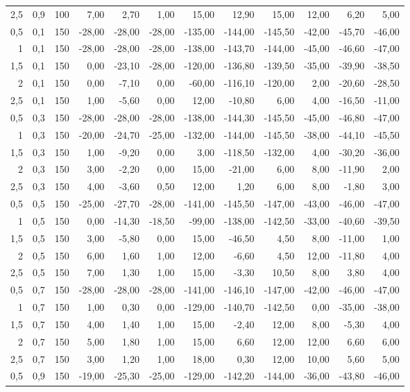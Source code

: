 \begin{table}[h]
\begin{tabular}{|r|r|r|r|r|r|r|r|r|r|r|r|}
2,5 & 0,9 & 100 & 7,00 & 2,70 & 1,00 & 15,00 & 12,90 & 15,00 & 12,00 & 6,20 & 5,00 \\
0,5 & 0,1 & 150 & -28,00 & -28,00 & -28,00 & -135,00 & -144,00 & -145,50 & -42,00 & -45,70 & -46,00 \\
1 & 0,1 & 150 & -28,00 & -28,00 & -28,00 & -138,00 & -143,70 & -144,00 & -45,00 & -46,60 & -47,00 \\
1,5 & 0,1 & 150 & 0,00 & -23,10 & -28,00 & -120,00 & -136,80 & -139,50 & -35,00 & -39,90 & -38,50 \\
2 & 0,1 & 150 & 0,00 & -7,10 & 0,00 & -60,00 & -116,10 & -120,00 & 2,00 & -20,60 & -28,50 \\
2,5 & 0,1 & 150 & 1,00 & -5,60 & 0,00 & 12,00 & -10,80 & 6,00 & 4,00 & -16,50 & -11,00 \\
0,5 & 0,3 & 150 & -28,00 & -28,00 & -28,00 & -138,00 & -144,30 & -145,50 & -45,00 & -46,80 & -47,00 \\
1 & 0,3 & 150 & -20,00 & -24,70 & -25,00 & -132,00 & -144,00 & -145,50 & -38,00 & -44,10 & -45,50 \\
1,5 & 0,3 & 150 & 1,00 & -9,20 & 0,00 & 3,00 & -118,50 & -132,00 & 4,00 & -30,20 & -36,00 \\
2 & 0,3 & 150 & 3,00 & -2,20 & 0,00 & 15,00 & -21,00 & 6,00 & 8,00 & -11,90 & 2,00 \\
2,5 & 0,3 & 150 & 4,00 & -3,60 & 0,50 & 12,00 & 1,20 & 6,00 & 8,00 & -1,80 & 3,00 \\
0,5 & 0,5 & 150 & -25,00 & -27,70 & -28,00 & -141,00 & -145,50 & -147,00 & -43,00 & -46,00 & -47,00 \\
1 & 0,5 & 150 & 0,00 & -14,30 & -18,50 & -99,00 & -138,00 & -142,50 & -33,00 & -40,60 & -39,50 \\
1,5 & 0,5 & 150 & 3,00 & -5,80 & 0,00 & 15,00 & -46,50 & 4,50 & 8,00 & -11,00 & 1,00 \\
2 & 0,5 & 150 & 6,00 & 1,60 & 1,00 & 12,00 & -6,60 & 4,50 & 12,00 & -11,80 & 4,00 \\
2,5 & 0,5 & 150 & 7,00 & 1,30 & 1,00 & 15,00 & -3,30 & 10,50 & 8,00 & 3,80 & 4,00 \\
0,5 & 0,7 & 150 & -28,00 & -28,00 & -28,00 & -141,00 & -146,10 & -147,00 & -42,00 & -46,00 & -47,00 \\
1 & 0,7 & 150 & 1,00 & 0,30 & 0,00 & -129,00 & -140,70 & -142,50 & 0,00 & -35,00 & -38,00 \\
1,5 & 0,7 & 150 & 4,00 & 1,40 & 1,00 & 15,00 & -2,40 & 12,00 & 8,00 & -5,30 & 4,00 \\
2 & 0,7 & 150 & 5,00 & 1,80 & 1,00 & 15,00 & 6,60 & 12,00 & 12,00 & 6,60 & 6,00 \\
2,5 & 0,7 & 150 & 3,00 & 1,20 & 1,00 & 18,00 & 0,30 & 12,00 & 10,00 & 5,60 & 5,00 \\
0,5 & 0,9 & 150 & -19,00 & -25,30 & -25,00 & -129,00 & -142,20 & -144,00 & -36,00 & -43,80 & -46,00 \\
\hline
\end{tabular}
\end{table}

